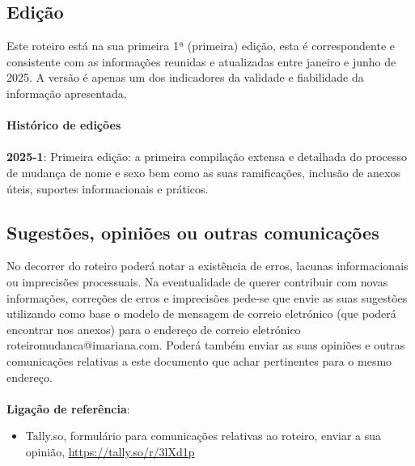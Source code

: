 \subsection{Edição}

Este roteiro está na sua primeira 1ª (primeira) edição, esta é
correspondente e consistente com as informações reunidas e atualizadas
entre janeiro e junho de 2025. A versão é apenas um dos indicadores da
validade e fiabilidade da informação apresentada. \\
\\
\textbf{Histórico de edições} \\
\\
\textbf{2025-1}: Primeira edição: a primeira compilação extensa e detalhada do
processo de mudança de nome e sexo bem como as suas ramificações,
inclusão de anexos úteis, suportes informacionais e práticos.

\subsection{Sugestões, opiniões ou outras comunicações}

No decorrer do roteiro poderá notar a existência de erros, lacunas
informacionais ou imprecisões processuais. Na eventualidade de querer
contribuir com novas informações, correções de erros e imprecisões
pede-se que envie as suas sugestões utilizando como base o modelo de
mensagem de correio eletrónico (que poderá encontrar nos anexos) para o
endereço de correio eletrónico roteiromudanca@imariana.com. Poderá
também enviar as suas opiniões e outras comunicações relativas a este
documento que achar pertinentes para o mesmo endereço. \\
\\
\textbf{Ligação de referência}:
\begin{itemize}
	\item Tally.so, formulário para comunicações relativas ao roteiro, enviar a sua opinião, \url{https://tally.so/r/3lXd1p}
\end{itemize}